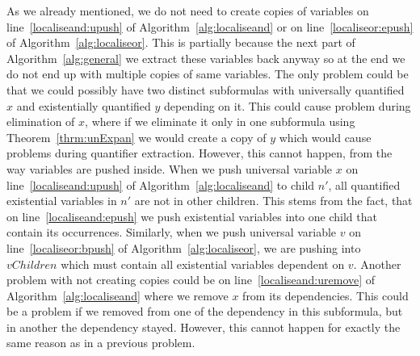 \documentclass[
  digital, %
  color,
  twoside, %
  table,   %
  nolof,     %
  nolot,     %
]{fithesis3}
\theoremstyle{definition}
\theoremstyle{remark}
\begin{document}
As we already mentioned, we do not need to create copies of variables on line~\ref{localiseand:upush} of Algorithm~\ref{alg:localiseand} or on line~\ref{localiseor:epush} of Algorithm~\ref{alg:localiseor}. This is partially because the next part of Algorithm~\ref{alg:general} we extract these variables back anyway so at the end we do not end up with multiple copies of same variables. The only problem could be that we could possibly have two distinct subformulas with universally quantified $x$ and existentially quantified $y$ depending on it. This could cause problem during elimination of $x$, where if we eliminate it only in one subformula using Theorem~\ref{thrm:unExpan} we would create a copy of $y$ which would cause problems during quantifier extraction. However, this cannot happen, from the way variables are pushed inside. When we push universal variable $x$ on line~\ref{localiseand:upush} of Algorithm~\ref{alg:localiseand} to child $n'$, all quantified existential variables in $n'$ are not in other children. This stems from the fact, that on line~\ref{localiseand:epush} we push existential variables into one child that contain its occurrences. Similarly, when we push universal variable $v$ on line~\ref{localiseor:bpush} of Algorithm~\ref{alg:localiseor}, we are pushing into $vChildren$ which must contain all existential variables dependent on $v$. Another problem with not creating copies could be on line~\ref{localiseand:uremove} of Algorithm~\ref{alg:localiseand} where we remove $x$ from its dependencies. This could be a problem if we removed from one of the dependency in this subformula, but in another the dependency stayed. However, this cannot happen for exactly the same reason as in a previous problem.
\end{document}
